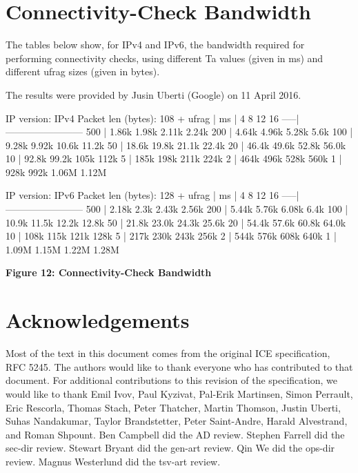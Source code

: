 \documentclass{article}
\begin{document}
\section{Connectivity-Check Bandwidth}

The tables below show, for IPv4 and IPv6, the bandwidth required for performing connectivity checks, using different Ta values (given in ms) and different ufrag sizes (given in bytes).

The results were provided by Jusin Uberti (Google) on 11 April 2016.

IP version: IPv4 Packet len (bytes): 108 + ufrag | ms |     4     8    12    16 -----|------------------------ 500 | 1.86k 1.98k 2.11k 2.24k 200 | 4.64k 4.96k 5.28k  5.6k 100 | 9.28k 9.92k 10.6k 11.2k 50 | 18.6k 19.8k 21.1k 22.4k 20 | 46.4k 49.6k 52.8k 56.0k 10 | 92.8k 99.2k  105k  112k 5 |  185k  198k  211k  224k 2 |  464k  496k  528k  560k 1 |  928k  992k 1.06M 1.12M

IP version: IPv6 Packet len (bytes): 128 + ufrag | ms |     4     8    12    16 -----|------------------------ 500 | 2.18k  2.3k 2.43k 2.56k 200 | 5.44k 5.76k 6.08k  6.4k 100 | 10.9k 11.5k 12.2k 12.8k 50 | 21.8k 23.0k 24.3k 25.6k 20 | 54.4k 57.6k 60.8k 64.0k 10 |  108k  115k  121k  128k 5 |  217k  230k  243k  256k 2 |  544k  576k  608k  640k 1 | 1.09M 1.15M 1.22M 1.28M

\begin{center}
\textbf{Figure 12: Connectivity-Check Bandwidth}
\end{center}

\section*{Acknowledgements}

Most of the text in this document comes from the original ICE specification, RFC 5245.  The authors would like to thank everyone who has contributed to that document.  For additional contributions to this revision of the specification, we would like to thank Emil Ivov, Paul Kyzivat, Pal-Erik Martinsen, Simon Perrault, Eric Rescorla, Thomas Stach, Peter Thatcher, Martin Thomson, Justin Uberti, Suhas Nandakumar, Taylor Brandstetter, Peter Saint-Andre, Harald Alvestrand, and Roman Shpount.  Ben Campbell did the AD review.  Stephen Farrell did the sec-dir review.  Stewart Bryant did the gen-art review.  Qin We did the ops-dir review.  Magnus Westerlund did the tsv-art review.
\end{document}
